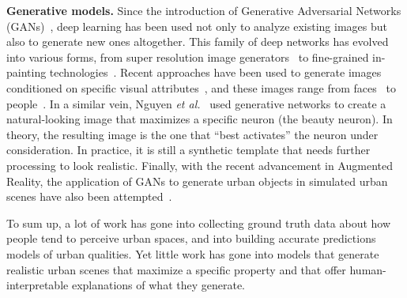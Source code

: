 \vspace{4pt}\noindent
\textbf{Generative models.} Since the introduction of Generative Adversarial Networks (GANs)~\cite{goodfellow2014generative}, deep learning has been used not only to analyze existing images but also to generate new ones altogether. This family of deep networks has evolved into various forms, from super resolution image generators~\cite{ledig2017photo} to fine-grained in-painting technologies~\cite{pathak2016context}. Recent approaches have been used to generate images conditioned on specific visual attributes~\cite{yan2015attribute2image}, and these images range from faces~\cite{taigman2016unsupervised} to people~\cite{ma2018disentangled}. In a similar vein, Nguyen \emph{et al.}~\cite{nguyen2016synthesizing} used generative networks to create a natural-looking image that maximizes a specific neuron (the beauty neuron).  In theory, the resulting image is the one that ``best activates'' the neuron under consideration. In practice, it is still a synthetic template that needs further processing to look realistic.   Finally, with the recent advancement in Augmented Reality, the application of GANs to generate urban objects in simulated urban scenes have also been attempted~\cite{alhaija2018augmented}. 

\vspace{4pt}
To sum up, a lot of work has gone into collecting ground truth data about how people tend to perceive urban spaces, and into building accurate predictions models of urban qualities. Yet little work has gone into models that generate realistic urban scenes that maximize a specific property and that offer human-interpretable explanations of what they generate. 


